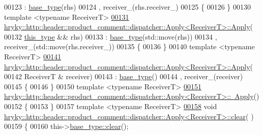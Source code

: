 \begin{DoxyCode}
00123     : \hyperlink{classhryky_1_1http_1_1header_1_1product__comment_1_1dispatcher_1_1_base}{base_type}(rhs)
00124       , receiver\_(rhs.receiver\_)
00125 \{
00126 \}
00130 \textcolor{keyword}{template} <\textcolor{keyword}{typename} ReceiverT>
\hypertarget{http__header__product__comment__dispatcher__apply_8h_source_l00131}{}\hyperlink{classhryky_1_1http_1_1header_1_1product__comment_1_1dispatcher_1_1_apply_ac9a5b5cd50a8065bbee4fd049df21fb3}{00131} \hyperlink{classhryky_1_1http_1_1header_1_1product__comment_1_1dispatcher_1_1_apply}{hryky::http::header::product_comment::dispatcher::Apply<ReceiverT>::Apply}(
00132     \hyperlink{classhryky_1_1http_1_1header_1_1product__comment_1_1dispatcher_1_1_apply}{this_type} && rhs)
00133     : \hyperlink{classhryky_1_1http_1_1header_1_1product__comment_1_1dispatcher_1_1_base}{base_type}(std::move(rhs))
00134       , receiver\_(std::move(rhs.receiver\_))
00135 \{
00136 \}
00140 \textcolor{keyword}{template} <\textcolor{keyword}{typename} ReceiverT>
\hypertarget{http__header__product__comment__dispatcher__apply_8h_source_l00141}{}\hyperlink{classhryky_1_1http_1_1header_1_1product__comment_1_1dispatcher_1_1_apply_a5def0bd5cb2dd0b70d5d1a5716bc8d9d}{00141} \hyperlink{classhryky_1_1http_1_1header_1_1product__comment_1_1dispatcher_1_1_apply}{hryky::http::header::product_comment::dispatcher::Apply<ReceiverT>::Apply}(
00142     ReceiverT & receiver)
00143     : \hyperlink{classhryky_1_1http_1_1header_1_1product__comment_1_1dispatcher_1_1_base}{base_type}()
00144       , receiver\_(receiver)
00145 \{
00146 \}
00150 \textcolor{keyword}{template} <\textcolor{keyword}{typename} ReceiverT>
\hypertarget{http__header__product__comment__dispatcher__apply_8h_source_l00151}{}\hyperlink{classhryky_1_1http_1_1header_1_1product__comment_1_1dispatcher_1_1_apply_a8e837f84e9413c667bd00e2e04e2ae92}{00151} \hyperlink{classhryky_1_1http_1_1header_1_1product__comment_1_1dispatcher_1_1_apply}{hryky::http::header::product_comment::dispatcher::Apply<ReceiverT>::~Apply}()
00152 \{
00153 \}
00157 \textcolor{keyword}{template} <\textcolor{keyword}{typename} ReceiverT>
\hypertarget{http__header__product__comment__dispatcher__apply_8h_source_l00158}{}\hyperlink{classhryky_1_1http_1_1header_1_1product__comment_1_1dispatcher_1_1_apply_a368a67c843d5546f22a569e2ddf58275}{00158} \textcolor{keywordtype}{void} \hyperlink{namespacehryky_aa201297ea9530da954a7230be71cc19d}{hryky::http::header::product_comment::dispatcher::Apply<ReceiverT>::clear}(
      )
00159 \{
00160     this->\hyperlink{namespacehryky_aa201297ea9530da954a7230be71cc19d}{base_type::clear}();

\end{DoxyCode}

